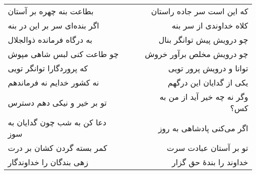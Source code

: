 \begin{center}
\begin{longtable}{l p{0.5cm} r}
بطاعت بنه چهره بر آستان
&&
که این است سر جاده راستان
\\
اگر بنده‌ای سر بر این در بنه
&&
کلاه خداوندی از سر بنه
\\
به درگاه فرمانده ذوالجلال
&&
چو درویش پیش توانگر بنال
\\
چو طاعت کنی لبس شاهی مپوش
&&
چو درویش مخلص برآور خروش
\\
که پروردگارا توانگر تویی
&&
توانا و درویش پرور تویی
\\
نه کشور خدایم نه فرماندهم
&&
یکی از گدایان این درگهم
\\
تو بر خیر و نیکی دهم دسترس
&&
وگر نه چه خیر آید از من به کس؟
\\
دعا کن به شب چون گدایان به سوز
&&
اگر می‌کنی پادشاهی به روز
\\
کمر بسته گردن کشان بر درت
&&
تو بر آستان عبادت سرت
\\
زهی بندگان را خداوندگار
&&
خداوند را بندهٔ حق گزار
\\
\end{longtable}
\end{center}
